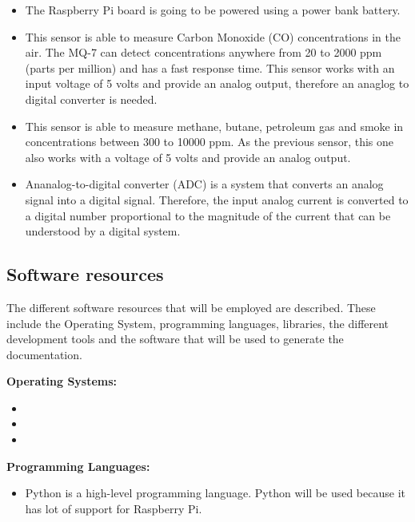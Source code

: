 \documentclass{pre-tfg}
\begin{document}
\begin{itemize}
	\item {} The Raspberry Pi board is going to be powered using a power bank battery.
	
	\item {} This sensor is able to measure Carbon Monoxide (CO) concentrations in the air. The MQ-7 can detect concentrations anywhere from 20 to 2000 ppm (parts per million) and has a fast response time. This sensor works with an input voltage of 5 volts and provide an analog output, therefore an anaglog to digital converter is needed.
	
	\item {} This sensor is able to measure methane, butane, petroleum gas and smoke in concentrations between 300 to 10000 ppm. As the previous sensor, this one also works with a voltage of 5 volts and provide an analog output.
	
	\item {} Ananalog-to-digital converter (ADC) is a system that converts an analog signal into a digital signal. Therefore, the input analog current is converted to a digital number proportional to the magnitude of the current that can be understood by a digital system.	
	
\end{itemize} 



\subsection{Software resources}
The different software resources that will be employed are described. These include the Operating System, programming languages, libraries, the different development tools and the software that will be used to generate the documentation.

\textbf{Operating Systems:}
\begin{itemize}
	\item {}
	\item {}
	\item {}
\end{itemize}

\textbf{Programming Languages:}
\begin{itemize}
	\item {} Python is a high-level programming language.  Python will be used because it has lot of support for Raspberry Pi.
	
\end{itemize}
\end{document}
